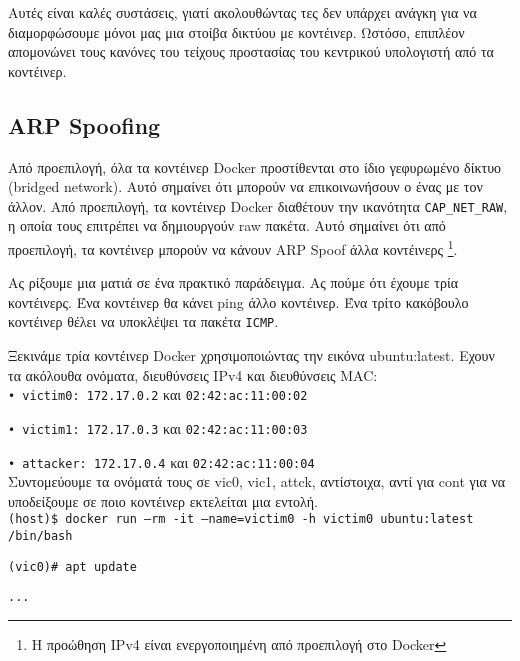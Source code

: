 Αυτές είναι καλές συστάσεις, γιατί ακολουθώντας τες δεν υπάρχει ανάγκη για να
διαμορφώσουμε μόνοι μας μια στοίβα δικτύου με κοντέινερ. Ωστόσο, επιπλέον
απομονώνει τους κανόνες του τείχους προστασίας του κεντρικού υπολογιστή από τα
κοντέινερ.

\subsection{\textlatin{ARP Spoofing}}

Από προεπιλογή, όλα τα κοντέινερ \textlatin{Docker} προστίθενται στο ίδιο
γεφυρωμένο δίκτυο (\textlatin{bridged network}). Αυτό σημαίνει ότι μπορούν να
επικοινωνήσουν ο ένας με τον άλλον. Από προεπιλογή, τα κοντέινερ
\textlatin{Docker} διαθέτουν την ικανότητα
\texttt{\textlatin{CAP\_NET\_RAW}}, η οποία τους επιτρέπει να δημιουργούν
\textlatin{raw} πακέτα. Αυτό σημαίνει ότι από προεπιλογή, τα κοντέινερ μπορούν
να κάνουν \textlatin{ARP Spoof} άλλα κοντέινερς \cite{Abusing-Containers}
\footnote{Η προώθηση \textlatin{IPv4} είναι ενεργοποιημένη από προεπιλογή στο
\textlatin{Docker}}.

Ας ρίξουμε μια ματιά σε ένα πρακτικό παράδειγμα. Ας πούμε ότι έχουμε τρία
κοντέινερς. Ένα κοντέινερ θα κάνει \textlatin{ping} άλλο κοντέινερ. Ένα τρίτο
κακόβουλο κοντέινερ θέλει να υποκλέψει τα πακέτα \texttt{\textlatin{ICMP}}.

Ξεκινάμε τρία κοντέινερ \textlatin{Docker} χρησιμοποιώντας την εικόνα
\textlatin{ubuntu:latest}. Εχουν τα ακόλουθα ονόματα, διευθύνσεις
\textlatin{IPv4} και διευθύνσεις \textlatin{MAC}: \\

\texttt{\textlatin{• victim0: 172.17.0.2}} και \texttt{\textlatin{02:42:ac:11:00:02}}

\texttt{\textlatin{• victim1: 172.17.0.3}} και \texttt{\textlatin{02:42:ac:11:00:03}}

\texttt{\textlatin{• attacker: 172.17.0.4}} και \texttt{\textlatin{02:42:ac:11:00:04}} \\

Συντομεύουμε τα ονόματά τους σε \textlatin{vic0, vic1, attck}, αντίστοιχα, αντί
για \textlatin{cont} για να υποδείξουμε σε ποιο κοντέινερ εκτελείται μια εντολή.
\\

\texttt{\textlatin{(host)\$ docker run --rm -it --name=victim0 -h victim0 ubuntu:latest /bin/bash}}

\texttt{\textlatin{(vic0)\# apt update}}

\texttt{\textlatin{...}}

